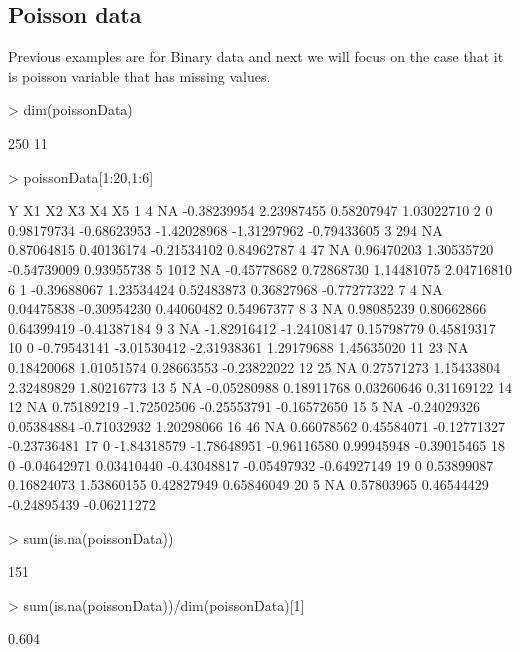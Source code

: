 \documentclass[a4paper]{article}
\begin{document}
\subsection{Poisson data}
Previous examples are for Binary data and next we will focus on the case that it is poisson variable that has missing values.
\begin{Schunk}
\begin{Sinput}
> dim(poissonData)
\end{Sinput}
\begin{Soutput}
[1] 250  11
\end{Soutput}
\begin{Sinput}
> poissonData[1:20,1:6]
\end{Sinput}
\begin{Soutput}
      Y          X1          X2          X3          X4          X5
1     4          NA -0.38239954  2.23987455  0.58207947  1.03022710
2     0  0.98179734 -0.68623953 -1.42028968 -1.31297962 -0.79433605
3   294          NA  0.87064815  0.40136174 -0.21534102  0.84962787
4    47          NA  0.96470203  1.30535720 -0.54739009  0.93955738
5  1012          NA -0.45778682  0.72868730  1.14481075  2.04716810
6     1 -0.39688067  1.23534424  0.52483873  0.36827968 -0.77277322
7     4          NA  0.04475838 -0.30954230  0.44060482  0.54967377
8     3          NA  0.98085239  0.80662866  0.64399419 -0.41387184
9     3          NA -1.82916412 -1.24108147  0.15798779  0.45819317
10    0 -0.79543141 -3.01530412 -2.31938361  1.29179688  1.45635020
11   23          NA  0.18420068  1.01051574  0.28663553 -0.23822022
12   25          NA  0.27571273  1.15433804  2.32489829  1.80216773
13    5          NA -0.05280988  0.18911768  0.03260646  0.31169122
14   12          NA  0.75189219 -1.72502506 -0.25553791 -0.16572650
15    5          NA -0.24029326  0.05384884 -0.71032932  1.20298066
16   46          NA  0.66078562  0.45584071 -0.12771327 -0.23736481
17    0 -1.84318579 -1.78648951 -0.96116580  0.99945948 -0.39015465
18    0 -0.04642971  0.03410440 -0.43048817 -0.05497932 -0.64927149
19    0  0.53899087  0.16824073  1.53860155  0.42827949  0.65846049
20    5          NA  0.57803965  0.46544429 -0.24895439 -0.06211272
\end{Soutput}
\begin{Sinput}
> sum(is.na(poissonData))
\end{Sinput}
\begin{Soutput}
[1] 151
\end{Soutput}
\begin{Sinput}
> sum(is.na(poissonData))/dim(poissonData)[1]
\end{Sinput}
\begin{Soutput}
[1] 0.604
\end{Soutput}
\end{Schunk}
\end{document}
